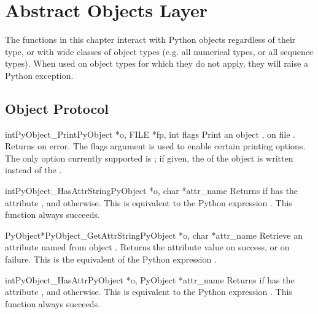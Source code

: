 \documentclass{manual}
\begin{document}
\chapter{Abstract Objects Layer \label{abstract}}

The functions in this chapter interact with Python objects regardless
of their type, or with wide classes of object types (e.g. all
numerical types, or all sequence types).  When used on object types
for which they do not apply, they will raise a Python exception.

\section{Object Protocol \label{object}}

\begin{cfuncdesc}{int}{PyObject_Print}{PyObject *o, FILE *fp, int flags}
Print an object , on file .  Returns  on error.
The flags argument is used to enable certain printing options.  The
only option currently supported is ; if given,
the  of the object is written instead of the
.
\end{cfuncdesc}

\begin{cfuncdesc}{int}{PyObject_HasAttrString}{PyObject *o, char *attr_name}
Returns  if  has the attribute , and
 otherwise.  This is equivalent to the Python expression
.
This function always succeeds.
\end{cfuncdesc}

\begin{cfuncdesc}{PyObject*}{PyObject_GetAttrString}{PyObject *o,
                                                     char *attr_name}
Retrieve an attribute named  from object .
Returns the attribute value on success, or \NULL{} on failure.
This is the equivalent of the Python expression
.
\end{cfuncdesc}


\begin{cfuncdesc}{int}{PyObject_HasAttr}{PyObject *o, PyObject *attr_name}
Returns  if  has the attribute , and
 otherwise.  This is equivalent to the Python expression
. 
This function always succeeds.
\end{cfuncdesc}
\end{document}
